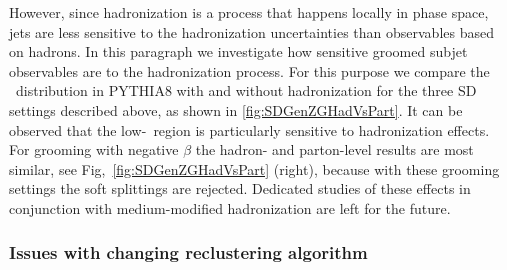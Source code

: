 However, since hadronization is a process that happens locally in phase space, jets are less sensitive to the hadronization uncertainties than observables based on hadrons. In this paragraph we investigate how sensitive groomed subjet observables are to the hadronization process. For this purpose we compare the \zg~distribution in PYTHIA8 with and without hadronization for the three SD settings described above, as shown in \autoref{fig:SDGenZGHadVsPart}. It can be observed that the low-\zg\, region is particularly sensitive to hadronization effects. For grooming with negative $\beta$ the hadron- and parton-level results are most similar, see Fig,~\ref{fig:SDGenZGHadVsPart} (right), because with these grooming settings the soft splittings are rejected. Dedicated studies of these effects in conjunction with medium-modified hadronization are left for the future.

\subsubsection{Issues with changing reclustering algorithm}
\label{sec:reclusteringalgo}

